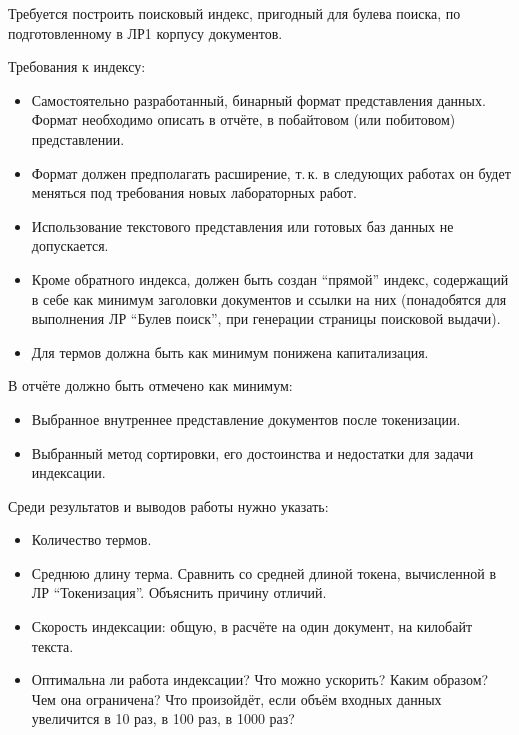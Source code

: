\pagebreak
{}

Требуется построить поисковый индекс, пригодный для булева поиска, по подготовленному в ЛР1 корпусу документов.

Требования к индексу:
\begin{itemize}
    \item Самостоятельно разработанный, бинарный формат представления данных. Формат необходимо описать в отчёте, в побайтовом (или побитовом) представлении.
    \item Формат должен предполагать расширение, т.\,к. в следующих работах он будет меняться под требования новых лабораторных работ.
    \item Использование текстового представления или готовых баз данных не допускается.
    \item Кроме обратного индекса, должен быть создан \enquote{прямой} индекс, содержащий в себе как минимум заголовки документов и ссылки на них (понадобятся для выполнения ЛР \enquote{Булев поиск}, при генерации страницы поисковой выдачи).
    \item Для термов должна быть как минимум понижена капитализация.
\end{itemize}

В отчёте должно быть отмечено как минимум:
\begin{itemize}
    \item Выбранное внутреннее представление документов после токенизации.
    \item Выбранный метод сортировки, его достоинства и недостатки для задачи индексации.
\end{itemize}

Среди результатов и выводов работы нужно указать:
\begin{itemize}
    \item Количество термов.
    \item Среднюю длину терма. Сравнить со средней длиной токена, вычисленной в ЛР \enquote{Токенизация}. Объяснить причину отличий.
    \item Скорость индексации: общую, в расчёте на один документ, на килобайт текста.
    \item Оптимальна ли работа индексации? Что можно ускорить? Каким образом? Чем она ограничена? Что произойдёт, если объём входных данных увеличится в 10 раз, в 100 раз, в 1000 раз?
\end{itemize}
